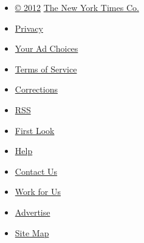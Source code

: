 \begin{itemize}
\tightlist
\item
  \href{//www.nytimes3xbfgragh.onion/ref/membercenter/help/copyright.html}{©
  2012} \href{//www.nytco.com/}{The New York Times Co.}
\item
  \href{//www.nytimes3xbfgragh.onion/privacy}{Privacy}
\item
  \href{//www.nytimes3xbfgragh.onion/ref/membercenter/help/privacy.html\#pp}{Your
  Ad Choices}
\item
  \href{//www.nytimes3xbfgragh.onion/ref/membercenter/help/agree.html}{Terms
  of Service}
\item
  \href{//www.nytimes3xbfgragh.onion/corrections.html}{Corrections}
\item
  \href{//www.nytimes3xbfgragh.onion/rss}{RSS}
\item
  \href{//firstlook.nytimes3xbfgragh.onion}{First Look}
\item
  \href{//www.nytimes3xbfgragh.onion/membercenter/sitehelp.html}{Help}
\item
  \href{//www.nytimes3xbfgragh.onion/ref/membercenter/help/infoservdirectory.html}{Contact
  Us}
\item
  \href{https://careers.nytco.com/TAM/nyt_docs/TAM/candidate.html}{Work
  for Us}
\item
  \href{//www.nytimes.whsites.net/mediakit/}{Advertise}
\item
  \href{//spiderbites.nytimes3xbfgragh.onion/}{Site Map}
\end{itemize}
